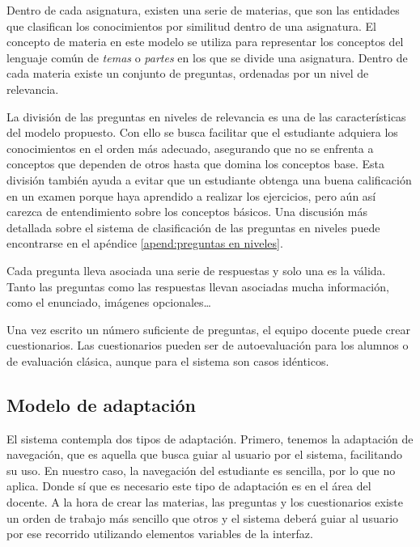 Dentro de cada asignatura, existen una serie de materias, que son las entidades que clasifican los conocimientos por similitud dentro de una asignatura. El concepto de materia en este modelo se utiliza para representar los conceptos del lenguaje común de \emph{temas} o \emph{partes} en los que se divide una asignatura. Dentro de cada materia existe un conjunto de preguntas, ordenadas por un nivel de relevancia.

La división de las preguntas en niveles de relevancia es una de las características del modelo propuesto. Con ello se busca facilitar que el estudiante adquiera los conocimientos en el orden más adecuado, asegurando que no se enfrenta a conceptos que dependen de otros hasta que domina los conceptos base. Esta división también ayuda a evitar que un estudiante obtenga una buena calificación en un examen porque haya aprendido a realizar los ejercicios, pero aún así carezca de entendimiento sobre los conceptos básicos. Una discusión más detallada sobre el sistema de clasificación de las preguntas en niveles puede encontrarse en el apéndice \ref{apend:preguntas en niveles}.

Cada pregunta lleva asociada una serie de respuestas y solo una es la válida. Tanto las preguntas como las respuestas llevan asociadas mucha información, como el enunciado, imágenes opcionales\ldots

Una vez escrito un número suficiente de preguntas, el equipo docente puede crear cuestionarios. Las cuestionarios pueden ser de autoevaluación para los alumnos o de evaluación clásica, aunque para el sistema son casos idénticos.


\subsection{Modelo de adaptación\label{sec:modelo adapatacion}}

El sistema contempla dos tipos de adaptación. Primero, tenemos la adaptación de navegación, que es aquella que busca guiar al usuario por el sistema, facilitando su uso. En nuestro caso, la navegación del estudiante es sencilla, por lo que no aplica. Donde sí que es necesario este tipo de adaptación es en el área del docente. A la hora de crear las materias, las preguntas y los cuestionarios existe un orden de trabajo más sencillo que otros y el sistema deberá guiar al usuario por ese recorrido utilizando elementos variables de la interfaz.

